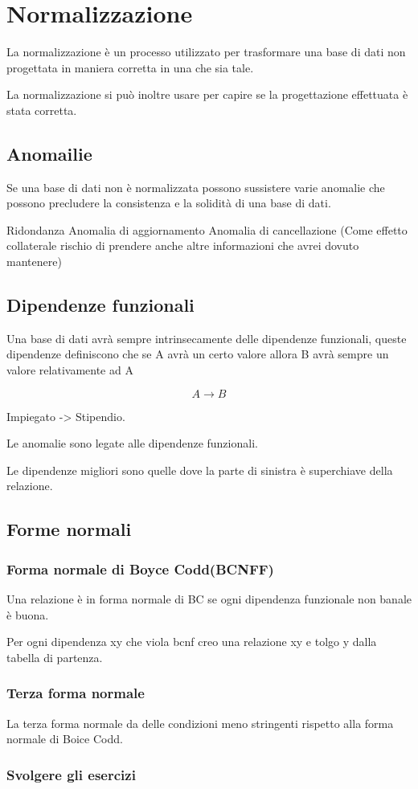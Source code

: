 \chapter{Normalizzazione}

La normalizzazione è un processo utilizzato per trasformare una base di dati non progettata in maniera corretta in una che sia tale.

La normalizzazione si può inoltre usare per capire se la progettazione effettuata è stata corretta.

\section{Anomailie}

Se una base di dati non è normalizzata possono sussistere varie anomalie che possono precludere la consistenza e la solidità di una base di dati.

Ridondanza
Anomalia di aggiornamento
Anomalia di cancellazione
(Come effetto collaterale rischio di prendere anche altre informazioni che avrei dovuto mantenere)

\section{Dipendenze funzionali}

Una base di dati avrà sempre intrinsecamente delle dipendenze funzionali, queste dipendenze definiscono che se A avrà un certo valore allora B avrà sempre un valore relativamente ad A

\[ A \rightarrow B\]

Impiegato -> Stipendio.

Le anomalie sono legate alle dipendenze funzionali.

Le dipendenze migliori sono quelle dove la parte di sinistra è superchiave della relazione.

\section{Forme normali}
\subsection{Forma normale di Boyce Codd(BCNFF)}

Una relazione è in forma normale di BC se ogni dipendenza funzionale non banale è buona.

Per ogni dipendenza xy che viola bcnf creo una relazione xy e tolgo y dalla tabella di partenza.

\subsection{Terza forma normale}

La terza forma normale da delle condizioni meno stringenti rispetto alla forma normale di Boice Codd.

\subsection{Svolgere gli esercizi}